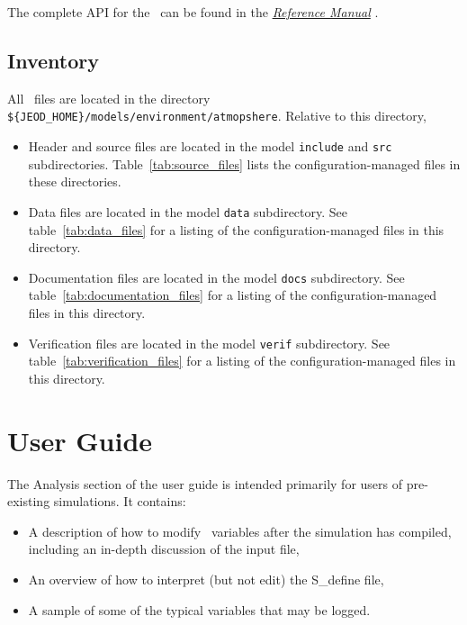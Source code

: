 The complete API for the \atmosphereDesc\ can be found
in the  \href{file:refman.pdf} {\em Reference Manual}
\cite{atmospherebib:ReferenceManual}.

\section{Inventory}
All \atmosphereDesc\ files are located in the directory \newline
{\tt \$\{JEOD\_HOME\}/models/environment/atmopshere}.
Relative to this directory,
\begin{itemize}
\vspace{-0.2\baselineskip}
\item Header and source files are located
in the model {\tt include} and {\tt src} subdirectories.
Table~\ref{tab:source_files} lists the
configuration-managed files in these directories.
\vspace{-0.1\baselineskip}
\item Data files are located in the model {\tt data} subdirectory.
See table~\ref{tab:data_files}
for a listing of the
configuration-managed files in this directory.
\vspace{-0.1\baselineskip}
\item Documentation files are located in the model {\tt docs} subdirectory.
See table~\ref{tab:documentation_files}
for a listing of the
configuration-managed files in this directory.
\vspace{-0.1\baselineskip}
\item Verification files are located in the model {\tt verif} subdirectory.
See table~\ref{tab:verification_files}
for a listing of the
configuration-managed files in this directory.
\end{itemize}



\chapter{User Guide}\label{ch:user}
The Analysis section of the user guide is intended primarily for users of pre-existing simulations.
It contains:
\begin{itemize}
\item A description of how to modify \atmosphereDesc\ variables after the simulation
has compiled, including an in-depth discussion of the input file,
\item An overview of how to interpret (but not edit) the S\_define file,
\item A sample of some of the typical variables that may be logged.
\end{itemize}


